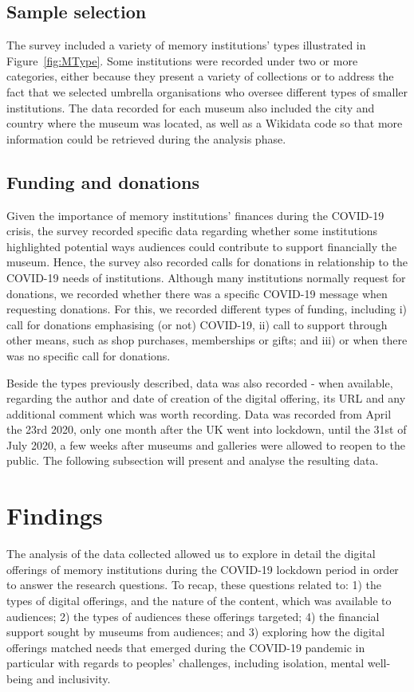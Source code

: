 \documentclass{egpubl}
\begin{document}
\subsection{Sample selection}
The survey included a variety of memory institutions’ types illustrated in Figure~\ref{fig:MType}. Some institutions were recorded under two or more categories, either because they present a variety of collections or to address the fact that we selected umbrella organisations who oversee different types of smaller institutions. The data recorded for each museum also included the city and country where the museum was located, as well as a Wikidata code so that more information could be retrieved during the analysis phase.

\subsection{Funding and donations}
\label{fund}
Given the importance of memory institutions’ finances during the COVID-19 crisis, the survey recorded specific data regarding whether some institutions highlighted potential ways audiences could contribute to support financially the museum. Hence, the survey also recorded calls for donations in relationship to the COVID-19 needs of institutions. Although many institutions normally request for donations, we recorded whether there was a specific COVID-19 message when requesting donations. For this, we recorded different types of funding, including i) call for donations emphasising (or not)  COVID-19, ii) call to support through other means, such as shop purchases, memberships or gifts; and iii) or when there was no specific call for donations.

Beside the types previously described, data was also recorded - when available, regarding the author and date of creation of the digital offering, its URL and any additional comment which was worth recording. Data was recorded from April the 23rd 2020, only one month after the UK went into lockdown, until the 31st of July 2020, a few weeks after museums and galleries were allowed to reopen to the public. The following subsection will present and analyse the resulting data. 


\section{Findings}
\label{find}
The analysis of the data collected allowed us to explore in detail the digital offerings of memory institutions during the COVID-19 lockdown period in order to answer the research questions. To recap, these questions related to: 1) the types of digital offerings, and the nature of the content, which was available to audiences; 2) the types of audiences these offerings targeted; 4) the financial support sought by museums from audiences; and 3) exploring how the digital offerings matched needs that emerged during the COVID-19 pandemic in particular with regards to peoples’ challenges, including isolation, mental well-being and inclusivity. 
\end{document}
